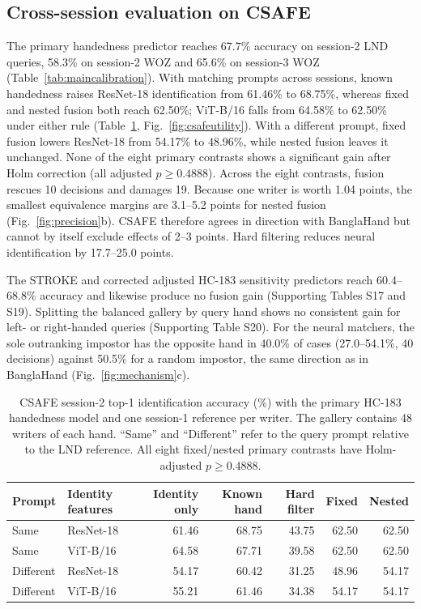 \subsection{Cross-session evaluation on CSAFE}
\label{sec:csafeexternal}
The primary handedness predictor reaches 67.7\% accuracy on session-2 LND queries, 58.3\% on session-2 WOZ and 65.6\% on session-3 WOZ (Table~\ref{tab:maincalibration}). With matching prompts across sessions, known handedness raises ResNet-18 identification from 61.46\% to 68.75\%, whereas fixed and nested fusion both reach 62.50\%; ViT-B/16 falls from 64.58\% to 62.50\% under either rule (Table~\ref{tab:csafemain}, Fig.~\ref{fig:csafeutility}). With a different prompt, fixed fusion lowers ResNet-18 from 54.17\% to 48.96\%, while nested fusion leaves it unchanged. None of the eight primary contrasts shows a significant gain after Holm correction (all adjusted $p\geq0.4888$). Across the eight contrasts, fusion rescues 10 decisions and damages 19. Because one writer is worth 1.04 points, the smallest equivalence margins are 3.1--5.2 points for nested fusion (Fig.~\ref{fig:precision}b). CSAFE therefore agrees in direction with BanglaHand but cannot by itself exclude effects of 2--3 points. Hard filtering reduces neural identification by 17.7--25.0 points.

The STROKE and corrected adjusted HC-183 sensitivity predictors reach 60.4--68.8\% accuracy and likewise produce no fusion gain (Supporting Tables S17 and S19). Splitting the balanced gallery by query hand shows no consistent gain for left- or right-handed queries (Supporting Table S20). For the neural matchers, the sole outranking impostor has the opposite hand in 40.0\% of cases (27.0--54.1\%, 40 decisions) against 50.5\% for a random impostor, the same direction as in BanglaHand (Fig.~\ref{fig:mechanism}c).

\begin{table}[!t]
\caption{CSAFE session-2 top-1 identification accuracy (\%) with the primary HC-183 handedness model and one session-1 reference per writer. The gallery contains 48 writers of each hand. ``Same'' and ``Different'' refer to the query prompt relative to the LND reference. All eight fixed/nested primary contrasts have Holm-adjusted $p\geq0.4888$.}\label{tab:csafemain}
\centering\small
\begin{tabular}{llrrrrr}\toprule
Prompt & Identity features & Identity only & Known hand & Hard filter & Fixed & Nested\\\midrule
Same & ResNet-18 & 61.46 & 68.75 & 43.75 & 62.50 & 62.50 \\
Same & ViT-B/16 & 64.58 & 67.71 & 39.58 & 62.50 & 62.50 \\
Different & ResNet-18 & 54.17 & 60.42 & 31.25 & 48.96 & 54.17 \\
Different & ViT-B/16 & 55.21 & 61.46 & 34.38 & 54.17 & 54.17 \\
\bottomrule
\end{tabular}
\end{table}

